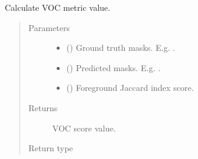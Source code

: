 \documentclass[letterpaper,10pt,english]{sphinxmanual}
\begin{document}
\begin{fulllineitems}
\label{\detokenize{engine/metrics:engine.metrics.voc_calculation}}
Calculate VOC metric value.
\begin{quote}\begin{description}
\item[{Parameters}] \leavevmode\begin{itemize}
\item {} 
 () \textendash{} Ground truth masks. E.g. .

\item {} 
 () \textendash{} Predicted masks. E.g. .

\item {} 
 () \textendash{} Foreground Jaccard index score.

\end{itemize}

\item[{Returns}] \leavevmode
{} \textendash{} VOC score value.

\item[{Return type}] \leavevmode
{}

\end{description}\end{quote}

\end{fulllineitems}

\end{document}
